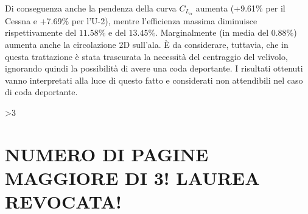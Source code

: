 \documentclass{jfm}
\begin{document}
Di conseguenza anche la pendenza della curva $C_{L_{\alpha}}$ aumenta (+9.61\% per il Cessna e +7.69\% per l'U-2), mentre l'efficienza massima diminuisce rispettivamente del $11.58\%$ e del $13.45\%$. Marginalmente (in media del $0.88\%$) aumenta anche la circolazione 2D sull'ala. \`E da considerare, tuttavia, che in questa trattazione è stata trascurata la necessità del centraggio del velivolo, ignorando quindi la possibilità di avere una coda deportante. I risultati ottenuti vanno interpretati alla luce di questo fatto e considerati non attendibili nel caso di coda deportante. 





  \ifnum\value{page}>3
    \section*{{\color{red} NUMERO DI PAGINE MAGGIORE DI 3! LAUREA REVOCATA!}}
  \fi  
\end{document}
